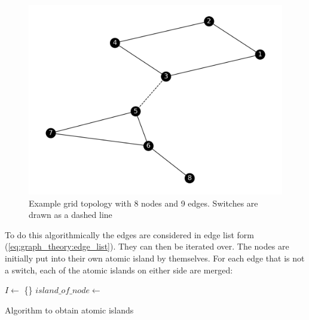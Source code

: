 \begin{figure}[H]
    \begin{center}
        \includegraphics[width=.7\linewidth]{img/atomic_island.png}
    \end{center}
    \caption{
        Example grid topology with 8 nodes and 9 edges. Switches
        are drawn as a dashed line
    }
    \label{fig:data_prep:atomic_islands}
\end{figure}

To do this algorithmically the edges are considered in edge list
form (\ref{eq:graph_theory:edge_list}). They can then be iterated over.
The nodes are initially put into their own atomic island by themselves.
For each edge that is not a switch, each of the atomic islands on either
side are merged:


\begin{algorithm}


    $I \gets $ \{\}\;
    $island\_of\_node \gets $ \New \Dict{}\;


    
    \caption{Algorithm to obtain atomic islands}
    \label{alg:data_prep:atomic_islands}
\end{algorithm}

